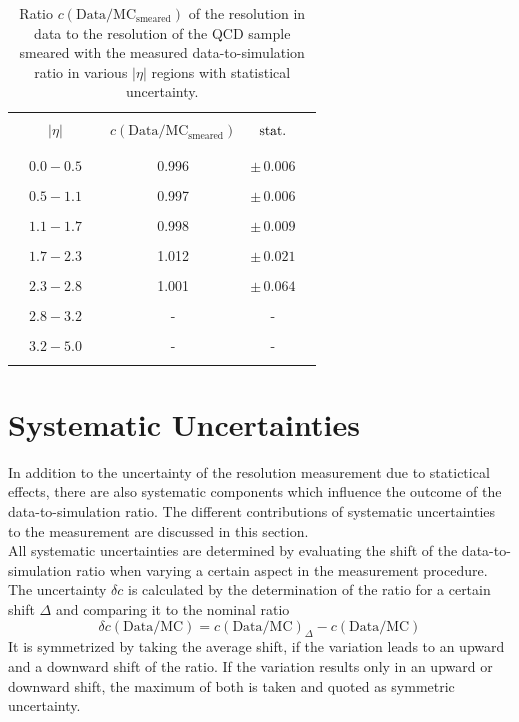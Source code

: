 \begin{table}[!tp]
\centering
\caption{Ratio $c\mathrm{(Data/MC_{smeared})}$ of the resolution in data to the resolution of the QCD sample smeared with the measured data-to-simulation ratio in various $|\eta|$ regions with statistical uncertainty.}
\label{tab:data_closure}
\begin{tabular}{cccccc}
\hline
 & & & & & \\
 & $|\eta|$ & & $c\mathrm{(Data/MC_{smeared})}$ & $\rm{stat.}$ & \\
 & & & & & \\
\hline
 & & & & & \\
 & $0.0 - 0.5$ & & 0.996 & $\pm \, 0.006$ & \\
 & & & & & \\
 & $0.5 - 1.1$ & & 0.997 & $\pm \, 0.006$ & \\
 & & & & & \\
 & $1.1 - 1.7$ & & 0.998 & $\pm \, 0.009$ & \\
 & & & & & \\
 & $1.7 - 2.3$ & & 1.012 & $\pm \, 0.021$ & \\
 & & & & & \\
 & $2.3 - 2.8$ & & 1.001 & $\pm \, 0.064$ & \\
 & & & & & \\   
 & $2.8 - 3.2$ & & - & - & \\
 & & & & & \\  
 & $3.2 - 5.0$ & & - & - & \\
 & & & & & \\ 
 \hline 
\end{tabular}%
\end{table} 


\section{Systematic Uncertainties}
\label{sec:jer_syst_unc}
In addition to the uncertainty of the resolution measurement due to statictical effects, there are also systematic components which influence the outcome of the data-to-simulation ratio. The different contributions of systematic uncertainties to the measurement are discussed in this section.\\
All systematic uncertainties are determined by evaluating the shift of the data-to-simulation ratio when varying a certain aspect in the measurement procedure. The uncertainty $\delta c$ is calculated by the determination of the ratio for a certain shift $\Delta$ and comparing it to the nominal ratio 
 \begin{equation}
  \delta c{\mathrm{(Data/MC)}} = c{\mathrm{(Data/MC)}_{\Delta}} - c\mathrm{(Data/MC)}
 \end{equation} 
It is symmetrized by taking the average shift, if the variation leads to an upward and a downward shift of the ratio. If the variation results only in an upward or downward shift, the maximum of both is taken and quoted as symmetric uncertainty.  

